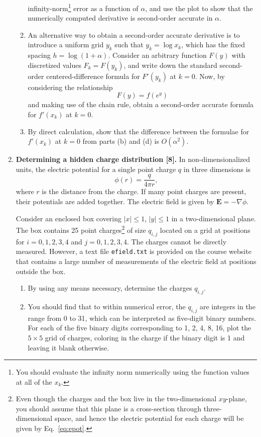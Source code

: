 \documentclass[11pt]{article}
\renewcommand{\vec}[1]{\mathbf{#1}}
\begin{document}
\begin{enumerate}
\begin{enumerate}
	infinity-norm\footnote{You should evaluate the infinity norm
	numerically using the function values at all of the $x_k$.} error
	 as
	a function of $\alpha$, and use the plot to show that the numerically
	computed derivative is second-order accurate in $\alpha$.
      \item An alternative way to obtain a second-order accurate derivative
	is to introduce a uniform grid $y_k$ such that $y_k=\log x_k$,
	which has the fixed spacing $h=\log (1+\alpha)$. Consider an arbitrary
	function $F(y)$ with discretized values $F_k=F(y_k)$, and write down
	the standard second-order centered-difference formula for $F'(y_k)$ at
	$k=0$. Now, by considering the relationship
	\begin{equation}
	  F(y)=f(e^y)
	\end{equation}
	and making use of the chain rule, obtain a second-order accurate
	formula for $f'(x_k)$ at $k=0$.
      \item By direct calculation, show that the difference between the
	formulae for $f'(x_k)$ at $k=0$ from parts (b) and (d) is
	$O(\alpha^2)$.
    \end{enumerate}
  \item \textbf{Determining a hidden charge distribution [8].} In
    non-dimensionalized units, the electric potential for a single point charge
    $q$ in three dimensions is
    \begin{equation}
      \phi(r) = \frac{q}{4\pi r},\label{eq:epot}
    \end{equation}
    where $r$ is the distance from the charge. If many point charges are
    present, their potentials are added together. The electric field is given
    by $\vec{E}=-\nabla \phi$.

    Consider an enclosed box covering $|x|\le 1$, $|y|\le 1$ in a
    two-dimensional plane. The box contains 25 point charges\footnote{Even
    though the charges and the box live in the two-dimensional $xy$-plane, you
    should assume that this plane is a cross-section through three-dimensional
    space, and hence the electric potential for each charge will be given by
    Eq.~\ref{eq:epot}.} of size $q_{i,j}$ located on a grid at positions
     for $i=0,1,2,3,4$ and
    $j=0,1,2,3,4$. The charges cannot be directly measured. However, a text
    file \texttt{efield.txt} is provided on the course website that contains a
    large number of measurements of the electric field at positions outside the
    box.
    \begin{enumerate}
      \item By using any means necessary, determine the charges $q_{i,j}$.
      \item You should find that to within numerical error, the $q_{i,j}$ are
	integers in the range from 0 to 31, which can be interpreted as
	five-digit binary numbers. For each of the five binary digits
	corresponding to 1, 2, 4, 8, 16, plot the $5\times 5$ grid of charges,
	coloring in the charge if the binary digit is 1 and leaving it blank
	otherwise.
    \end{enumerate}
\end{enumerate}
\end{document}
